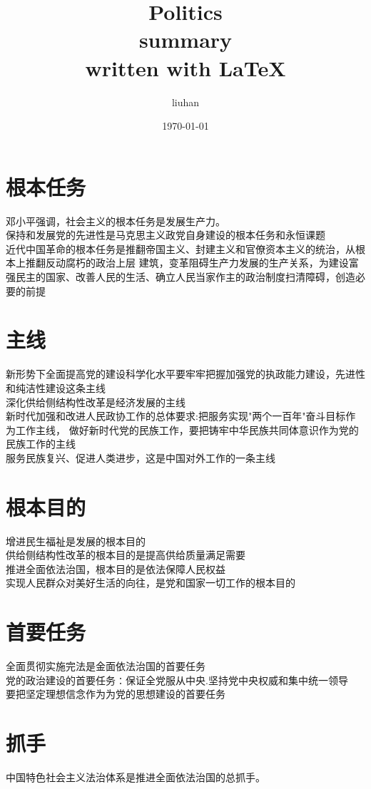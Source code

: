 \documentclass[11pt,a4paper,titlepage]{article}
\title{\blue Politics \\
\blueb summary\\
\textb written with \LaTeX }
\author{liuhan}
\date{\today}
\begin{document}
\maketitle
\tableofcontents 
\newpage
\section{根本任务}
邓小平强调，社会主义的根本任务是发展生产力。\\
保持和发展党的先进性是马克思主义政党自身建设的根本任务和永恒课题\\
近代中国革命的根本任务是推翻帝国主义、封建主义和官僚资本主义的统治，从根本上推翻反动腐朽的政治上层
建筑，变革阻碍生产力发展的生产关系，为建设富强民主的国家、改善人民的生活、确立人民当家作主的政治制度扫清障碍，创造必要的前提\\
\section{主线}
新形势下全面提高党的建设科学化水平要牢牢把握加强党的执政能力建设，先进性和纯洁性建设这条主线\\
深化供给侧结构性改革是经济发展的主线\\
新时代加强和改进人民政协工作的总体要求:把服务实现"两个一百年"奋斗目标作为工作主线，
做好新时代党的民族工作，要把铸牢中华民族共同体意识作为党的民族工作的主线\\
服务民族复兴、促进人类进步，这是中国对外工作的一条主线\\
\section{根本目的}
增进民生福祉是发展的根本目的\\
供给侧结构性改革的根本目的是提高供给质量满足需要\\
推进全面依法治国，根本目的是依法保障人民权益\\
实现人民群众对美好生活的向往，是党和国家一切工作的根本目的\\
\section{首要任务}
全面贯彻实施完法是金面依法治国的首要任务\\
党的政治建设的首要任务∶保证全党服从中央.坚持党中央权威和集中统一领导\\
要把坚定理想信念作为为党的思想建设的首要任务\\
\section{抓手}
中国特色社会主义法治体系是推进全面依法治国的总抓手。\\
\end{document}
